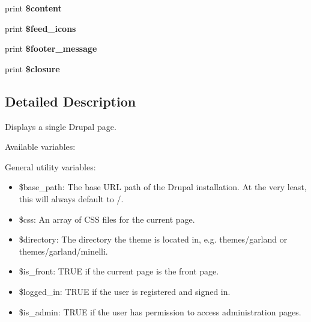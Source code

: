 \begin{CompactItemize}
\item 
\hypertarget{modules_2system_2page_8tpl_8php_b7b7210f43aa78e34f0b202de894a74c}{
print \textbf{\$content}}
\label{modules_2system_2page_8tpl_8php_b7b7210f43aa78e34f0b202de894a74c}

\item 
\hypertarget{modules_2system_2page_8tpl_8php_b467b853777a9bfda790f67537c97eca}{
print \textbf{\$feed\_\-icons}}
\label{modules_2system_2page_8tpl_8php_b467b853777a9bfda790f67537c97eca}

\item 
\hypertarget{modules_2system_2page_8tpl_8php_21c33de89f84315eed89e5ee1418adb1}{
print \textbf{\$footer\_\-message}}
\label{modules_2system_2page_8tpl_8php_21c33de89f84315eed89e5ee1418adb1}

\item 
\hypertarget{modules_2system_2page_8tpl_8php_0a9345d407f230cc6db96e95c6093854}{
print \textbf{\$closure}}
\label{modules_2system_2page_8tpl_8php_0a9345d407f230cc6db96e95c6093854}

\end{CompactItemize}


\subsection{Detailed Description}
Displays a single Drupal page.

Available variables:

General utility variables:\begin{itemize}
\item \$base\_\-path: The base URL path of the Drupal installation. At the very least, this will always default to /.\item \$css: An array of CSS files for the current page.\item \$directory: The directory the theme is located in, e.g. themes/garland or themes/garland/minelli.\item \$is\_\-front: TRUE if the current page is the front page.\item \$logged\_\-in: TRUE if the user is registered and signed in.\item \$is\_\-admin: TRUE if the user has permission to access administration pages.\end{itemize}


